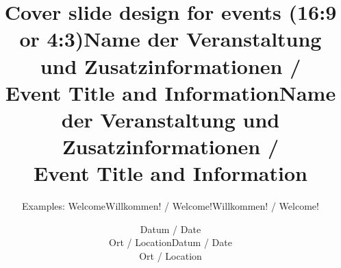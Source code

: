 \documentclass[aspectratio=169]{beamer}
\begin{document}

  \begin{frame}[plain]
    \subtitle{Examples: Welcome}
    \title{Cover slide design for events (16:9 or 4:3)}
    \makewelcome
  \end{frame}


  \begin{frame}[plain]
    \subtitle{Willkommen! / Welcome!}
    \title{Name der Veranstaltung und Zusatzinformationen / \\ Event Title and Information}
    \date{Datum / Date \\
      Ort / Location}

    \makewelcome
  \end{frame}


  \begin{frame}[plain]
    \ifwide %
    \else %
    \fi

    \subtitle{Willkommen! / Welcome!}
    \title{Name der Veranstaltung und Zusatzinformationen / \\ Event Title and Information}
    \date{Datum / Date \\
      Ort / Location}

    \makewelcome

  \end{frame}
\end{document}
